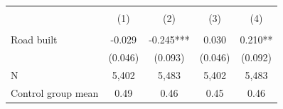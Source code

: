 {
\def\sym#1{\ifmmode^{#1}\else\(^{#1}\)\fi}
\begin{tabular}{l*{4}{c}}
\hline\hline
                         &&\\\cmidrule(lr){2-3}\cmidrule(lr){4-5}
                         &&&&\\
                         &&&&\\
\hline
Road built               &      -0.029   &      -0.245***&       0.030   &       0.210** \\
                         &     (0.046)   &     (0.093)   &     (0.046)   &     (0.092)   \\
\hline
N                        &       5,402   &       5,483   &       5,402   &       5,483   \\
Control group mean       &        0.49   &        0.46   &        0.45   &        0.46   \\
\hline\hline
\end{tabular}
}
